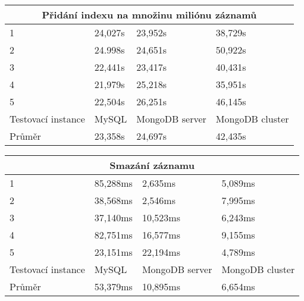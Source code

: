 \begin{table}[h]
\centering
\begin{tabular}{ | l | l | l | l | }
\hline
\multicolumn{4}{|c|}{Přidání indexu na množinu miliónu záznamů} \\ \hline
1 & 24,027s & 23,952s & 38,729s \\ \hline
2 & 24.998s & 24,651s & 50,922s \\ \hline
3 & 22,441s & 23,417s & 40,431s \\ \hline
4 & 21,979s & 25,218s & 35,951s \\ \hline
5 & 22,504s & 26,251s & 46,145s \\ \hline
Testovací instance &MySQL&MongoDB server & MongoDB cluster \\ \hline
Průměr & 23,358s & 24,697s & 42,435s \\ \hline
\end{tabular}
\end{table}

\begin{table}[h]
\centering
\begin{tabular}{ | l | l | l | l | }
\hline
\multicolumn{4}{|c|}{Smazání záznamu } \\ \hline
1 & 85,288ms & 2,635ms & 5,089ms \\ \hline
2 & 38,568ms & 2,546ms & 7,995ms \\ \hline
3 & 37,140ms & 10,523ms & 6,243ms \\ \hline
4 & 82,751ms & 16,577ms & 9,155ms \\ \hline
5 & 23,151ms & 22,194ms & 4,789ms \\ \hline
Testovací instance &MySQL&MongoDB server & MongoDB cluster \\ \hline
Průměr & 53,379ms & 10,895ms & 6,654ms \\ \hline
\end{tabular}
\end{table}


